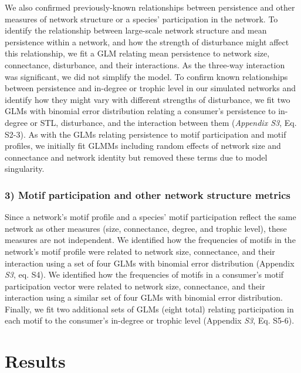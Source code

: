 \documentclass[12pt]{article}
\begin{document}
\begin{spacing}{2.0}
            We also confirmed previously-known relationships between persistence and other measures of network structure or a species' participation in the network.
            To identify the relationship between large-scale network structure and mean persistence within a network, and how the strength of disturbance might affect this relationship, we fit a GLM relating mean persistence to network size, connectance, disturbance, and their interactions.
            As the three-way interaction was significant, we did not simplify the model. 
            To confirm known relationships between persistence and in-degree or trophic level in our simulated networks and identify how they might vary with different strengths of disturbance, we fit two GLMs with binomial error distribution relating a consumer's persistence to in-degree or STL, disturbance, and the interaction between them (\emph{Appendix S3}, Eq. S2-3).
            As with the GLMs relating persistence to motif participation and motif profiles, we initially fit GLMMs including random effects of network size and connectance and network identity but removed these terms due to model singularity.



        \subsubsection*{3) Motif participation and other network structure metrics}

            Since a network's motif profile and a species' motif participation reflect the same network as other measures (size, connectance, degree, and trophic level), these measures are not independent. 
            We identified how the frequencies of motifs in the network's motif profile were related to network size, connectance, and their interaction using a set of four GLMs with binomial error distribution (Appendix \emph{S3}, eq. S4).
            We identified how the frequencies of motifs in a consumer's motif participation vector were related to network size, connectance, and their interaction using a similar set of four GLMs with binomial error distribution.
            Finally, we fit two additional sets of GLMs (eight total) relating participation in each motif to the consumer's in-degree or trophic level (Appendix \emph{S3}, Eq. S5-6).
        
        
\section*{Results}


\end{spacing}
\end{document}
